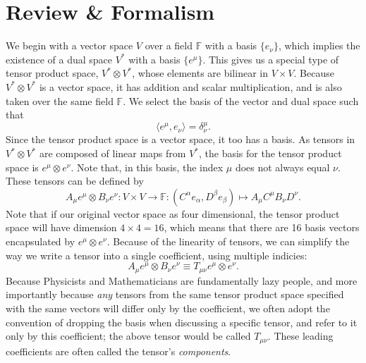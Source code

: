 \section{Review \& Formalism}
We begin with a vector space $V$ over a field $\mathbb{F}$ with a basis $\{e_\nu\}$, which implies the existence of a dual space $V^*$ with a basis $\{e^\mu\}$.
This gives us a special type of tensor product space, $ V^* \otimes V^*$, whose elements are bilinear in $V \times V$.
Because $V^* \otimes V^*$ is a vector space, it has addition and scalar multiplication, and is also taken over the same field $\mathbb{F}$.
We select the basis of the vector and dual space such that
\[ \langle e^\mu, e_\nu \rangle = \delta^\mu_\nu. \]
Since the tensor product space is a vector space, it too has a basis.
As tensors in $V^* \otimes V^*$ are composed of linear maps from $V^*$, the basis for the tensor product space is $e^\mu \otimes e^\nu$.
Note that, in this basis, the index $\mu$ does not always equal $\nu$.
These tensors can be defined by
\[ A_\mu e^\mu \otimes B_\nu e^\nu : V \times V \to \mathbb{F} : (C^\alpha e_\alpha, D^\beta e_\beta) \mapsto A_\mu C^\mu B_\nu D^\nu. \]
Note that if our original vector space as four dimensional, the tensor product space will have dimension $4 \times 4 = 16$, which means that there are 16 basis vectors encapsulated by $e^\mu \otimes e^\nu$.
Because of the linearity of tensors, we can simplify the way we write a tensor into a single coefficient, using multiple indicies:
\[ A_\mu e^\mu \otimes B_\nu e^\nu \equiv T_{\mu\nu} e^\mu \otimes e^\nu. \]
Because Physicists and Mathematicians are fundamentally lazy people, and more importantly because \emph{any} tensors from the same tensor product space specified with the same vectors will differ only by the coefficient, we often adopt the convention of dropping the basis when discussing a specific tensor, and refer to it only by this coefficient; the above tensor would be called $T_{\mu\nu}$. These leading coefficients are often called the tensor's \emph{components}.
